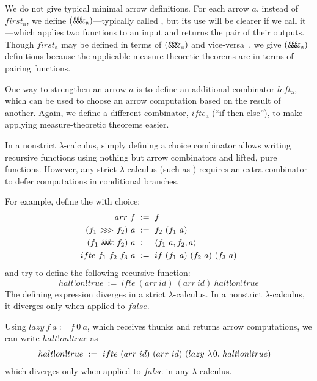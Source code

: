 \documentclass[preprint]{sigplanconf}
\newcommand{\arrowarr}{\ensuremath{arr}}
\newcommand{\arrowcomp}{\ensuremath{{>}\mspace{-6mu}{>}\mspace{-6mu}{>}}}
\newcommand{\arrowpair}{\ensuremath{\mathit{\&\mspace{-7.5mu}\&\mspace{-7.5mu}\&}}}
\newcommand{\arrowif}{\ensuremath{ifte}}
\newcommand{\arrowlazy}{\ensuremath{lazy}}
\newcommand{\gen}{_\mathrm{a}}
\begin{document}
We do not give typical minimal arrow definitions.
For each arrow $a$, instead of $first\gen$, we define $(\arrowpair\gen)$---typically called , but its use will be clearer if we call it ---which applies two functions to an input and returns the pair of their outputs.
Though $first\gen$ may be defined in terms of $(\arrowpair\gen)$ and vice-versa~\cite{cit:hughes-2005afp-arrows}, we give $(\arrowpair\gen)$ definitions because the applicable measure-theoretic theorems are in terms of pairing functions.

One way to strengthen an arrow $a$ is to define an additional combinator $left\gen$, which can be used to choose an arrow computation based on the result of another.
Again, we define a different combinator, $\arrowif\gen$ (``if-then-else''), to make applying measure-theoretic theorems easier.

In a nonstrict $\lambda$-calculus, simply defining a choice combinator allows writing recursive functions using nothing but arrow combinators and lifted, pure functions.
However, any strict $\lambda$-calculus (such as \lzfclang) requires an extra combinator to defer computations in conditional branches.

For example, define the  with choice:
\begin{equation}
\begin{aligned}
	\arrowarr~f &\ := \ f \\
	(f_1~\arrowcomp~f_2)~a &\ := \ f_2~(f_1~a) \\
	(f_1~\arrowpair~f_2)~a &\ := \ \pair{f_1~a,f_2,a} \\
	\arrowif~f_1~f_2~f_3~a &\ := \ if~(f_1~a)~(f_2~a)~(f_3~a) \\
\end{aligned}
\label{eqn:function-arrow}
\end{equation}
and try to define the following recursive function:
\begin{equation}
	halt!on!true \ := \ \arrowif~(\arrowarr~id)~(\arrowarr~id)~halt!on!true
\end{equation}
The defining expression diverges in a strict $\lambda$-calculus.
In a nonstrict $\lambda$-calculus, it diverges only when applied to $false$.

Using $\arrowlazy~f~a := f~0~a$, which receives thunks and returns arrow computations, we can write $halt!on!true$ as
\begin{equation}
\begin{aligned}
	&halt!on!true \ := \ 
	\arrowif~(\arrowarr~id)~(\arrowarr~id)~(\arrowlazy~\fun{0}{halt!on!true})
\end{aligned}
\end{equation}
which diverges only when applied to $false$ in any $\lambda$-calculus.
\end{document}

